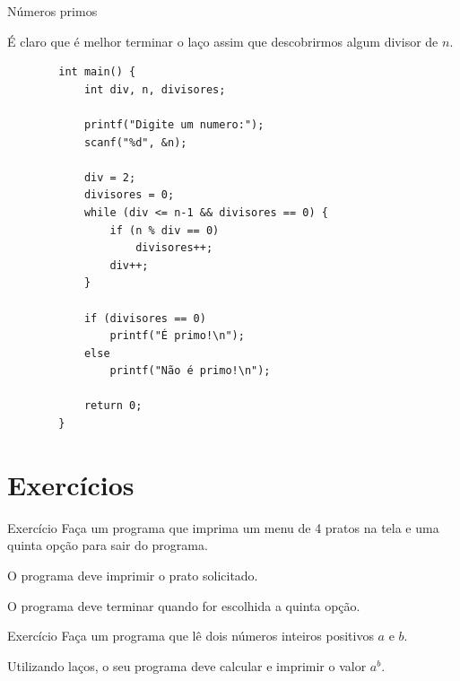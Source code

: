 \documentclass[handout]{beamer}
\begin{document}
\begin{frame}[fragile]{Números primos}

    É claro que é melhor terminar o laço assim que descobrirmos algum divisor de $n$.

    \begin{verbatim}
        int main() {
            int div, n, divisores;

            printf("Digite um numero:");
            scanf("%d", &n);

            div = 2;
            divisores = 0; 
            while (div <= n-1 && divisores == 0) {
                if (n % div == 0)
                    divisores++;
                div++;
            }
            
            if (divisores == 0)
                printf("É primo!\n");
            else
                printf("Não é primo!\n");

            return 0;
        }
    \end{verbatim}
\end{frame}

\section{Exercícios}

\begin{frame}[fragile]{Exercício}
    Faça um programa que imprima um menu de 4 pratos na tela e uma quinta opção para sair do programa.

    O programa deve imprimir o prato solicitado.

    O programa deve terminar quando for escolhida a quinta opção.
\end{frame}

\begin{frame}[fragile]{Exercício}
    Faça um programa que lê dois números inteiros positivos $a$ e $b$.

    Utilizando laços, o seu programa deve calcular e imprimir o valor $a^b$.
\end{frame}
\end{document}
